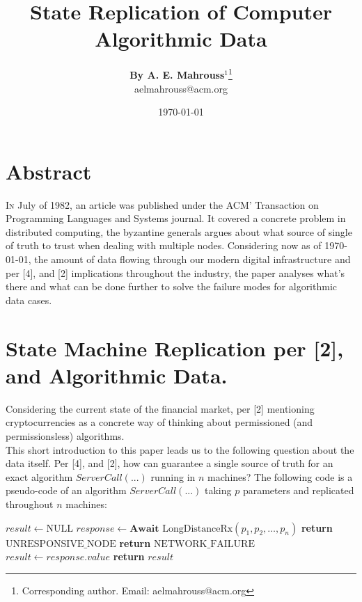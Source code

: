 \documentclass[10pt, twocolumn]{article}
\title{%
  \vspace{-1.5em}%
  \large\textbf{State Replication of Computer Algorithmic Data}%
}
\author{%
  \textbf{By A. E. Mahrouss}$^{1}$\thanks{Corresponding author. Email: aelmahrouss@acm.org}
  \\aelmahrouss@acm.org\\[0.4em]
}
\date{%
  \small \today
}
\theoremstyle{plain}
\theoremstyle{definition}
\theoremstyle{remark}
\begin{document}

\twocolumn[{%
  \maketitle
  \vspace{-0.5em}
  \vspace{0.8em}
  \rule{\linewidth}{0.4pt}
  \vspace{1em}
}]


\section{Abstract}

\lettrine[lines=2, lhang=0.1, loversize=0.2]{I}n July of 1982, an article was published under the ACM' Transaction on Programming Languages and Systems journal. It covered a concrete problem in distributed computing, the byzantine generals argues about what source of single of truth to trust when dealing with multiple nodes. Considering now as of \today, the amount of data flowing through our modern digital infrastructure and per [4], and [2] implications throughout the industry, the paper analyses what's there and what can be done further to solve the failure modes for algorithmic data cases.

\section{State Machine Replication per [2], and Algorithmic Data.}

Considering the current state of the financial market, per [2] mentioning cryptocurrencies as a concrete way of thinking about permissioned (and permissionsless) algorithms.\\
This short introduction to this paper leads us to the following question about the data itself. Per [4], and [2], how can guarantee a single source of truth for an exact algorithm $ServerCall(...)$ running in $n$ machines? The following code is a pseudo-code of an algorithm $ServerCall(...)$ taking $p$ parameters and replicated throughout $n$ machines:

\begin{algorithm}
\caption{ServerCall(...)}
\begin{algorithmic}[1]
    \State $result \leftarrow \text{NULL}$
    \State $response \leftarrow \textbf{Await } \text{LongDistanceRx}(p_1, p_2, \dots, p_n)$
        \State \textbf{return} $\text{UNRESPONSIVE\_NODE}$
        \State \textbf{return} $\text{NETWORK\_FAILURE}$
    \Else
        \State $result \leftarrow response.value$
        \State \textbf{return} $result$
    \EndIf
\EndProcedure
\end{algorithmic}
\end{algorithm}
\end{document}
